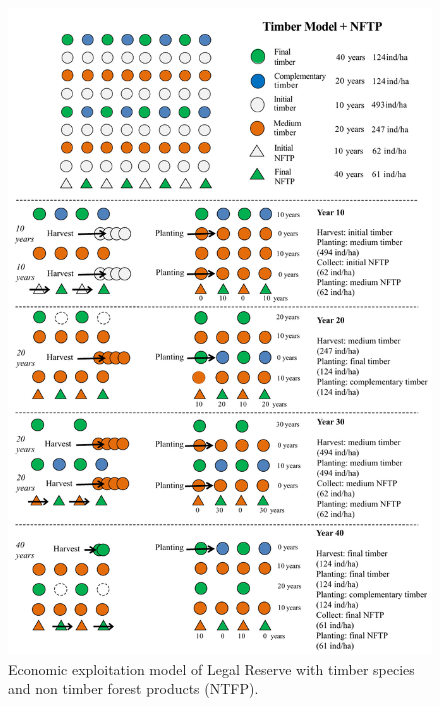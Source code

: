   \begin{figure}
\centering
\includegraphics[width=\textwidth]{pictureve/socio-modeloNTFP.pdf}
\caption{Economic exploitation model of Legal Reserve with timber species and non timber forest products (NTFP).} \label{fig:modelNTFP}
\end{figure}